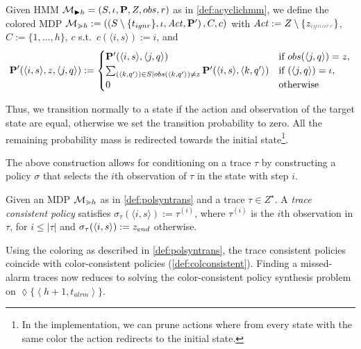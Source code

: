 \documentclass[runningheads]{llncs}
\newcommand{\Obs}{Z}
\newcommand{\talrm}{t_{alrm}}
\newcommand{\tig}{t_{ignr}}
\newcommand{\ig}{z_{\color{gray} ignore}\xspace}
\newcommand{\en}{z_{\color{black} end}\xspace}
\newcommand{\alarms}[1][h+1]{\left\langle #1, \talrm\right\rangle}
\newcommand{\defeq}{:=}
\begin{document}
\begin{definition}\label{def:polsyntrans}
    Given HMM $\mc_{\blacktriangleright h} = \left(\Sts, \init, \ptrans, \Obs, \obsf, r \right)$ as in \cref{def:acyclichmm}, we define the colored MDP $\mdp_{\gtrdot h} \defeq \left(\left(\Sts\setminus\{\tig\}, \init, \Act, \ptrans' \right), C, c\right)$ with $\Act \defeq \Obs\setminus\{\ig\}$, $C \defeq \{1,\ldots,h\}$, $c$ s.t.\  $c(\langle i,s \rangle) \defeq i$, and
    \begin{align*}
        \ptrans'(\langle i, s\rangle, z, \langle j, q\rangle) \defeq
        \begin{cases}
            \ptrans'(\langle i, s\rangle, \langle j, q\rangle)                                                                             & \text{if } \obsf(\langle j, q\rangle) = z, \\
            \sum_{(\langle k, q'\rangle)\in S \mid \obsf(\langle k, q'\rangle) \neq z} \ptrans'(\langle i, s\rangle, \langle k, q'\rangle) & \text{if } (\langle j, q\rangle) = \iota , \\
            0                                                                                                                              & \text{otherwise}
        \end{cases}
    \end{align*}
\end{definition}
Thus, we transition normally to a state if the action and observation of the target state are equal, otherwise we set the transition probability to zero. All the remaining probability mass is redirected towards the initial state\footnote{In the implementation, we can prune actions where from every state with the same color the action redirects to the initial state.}.

The above construction allows for conditioning on a trace $\tau$ by constructing a policy $\sigma$ that selects the $i$th observation of $\tau$ in the state with step $i$.
\begin{definition}
    Given an MDP $\mathcal{M}_{\gtrdot h}$ as in \cref{def:polsyntrans} and a trace $\tau \in Z^\star$. A \emph{trace consistent policy} satisfies $\sigma_\tau(\langle i, s \rangle) \defeq \tau^{(i)}$, where $\tau^{(i)}$ is the $i$th observation in $\tau$, for $i \leq |\tau|$ and $\sigma_\tau(\langle i, s \rangle) \defeq \en$ otherwise.
\end{definition}
Using the coloring as described in \cref{def:polsyntrans}, the trace consistent policies coincide with color-consistent policies (\cref{def:colconsistent}). Finding a missed-alarm traces now reduces to solving the color-consistent policy synthesis problem on $\lozenge \{ \alarms \}$.
\end{document}
